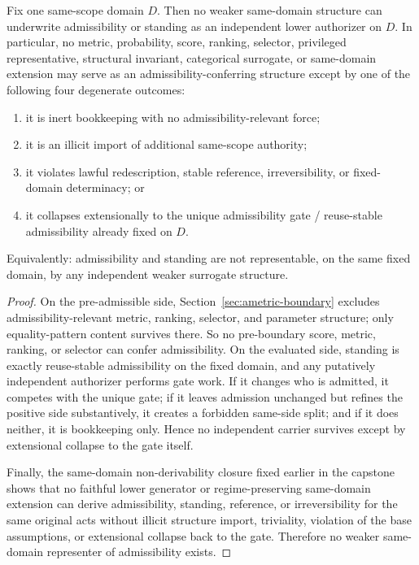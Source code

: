 \begin{theorem}
\label{thm:nonrepresentability-admissibility}
Fix one same-scope domain $D$. Then no weaker same-domain structure can underwrite admissibility or standing as an independent lower authorizer on $D$. In particular, no metric, probability, score, ranking, selector, privileged representative, structural invariant, categorical surrogate, or same-domain extension may serve as an admissibility-conferring structure except by one of the following four degenerate outcomes:
\begin{enumerate}
  \item it is inert bookkeeping with no admissibility-relevant force;
  \item it is an illicit import of additional same-scope authority;
  \item it violates lawful redescription, stable reference, irreversibility, or fixed-domain determinacy; or
  \item it collapses extensionally to the unique admissibility gate / reuse-stable admissibility already fixed on $D$.
\end{enumerate}
Equivalently: admissibility and standing are not representable, on the same fixed domain, by any independent weaker surrogate structure.
\end{theorem}

\begin{proof}
On the pre-admissible side, Section~\ref{sec:ametric-boundary} excludes admissibility-relevant metric, ranking, selector, and parameter structure; only equality-pattern content survives there. So no pre-boundary score, metric, ranking, or selector can confer admissibility. On the evaluated side, standing is exactly reuse-stable admissibility on the fixed domain, and any putatively independent authorizer performs gate work. If it changes who is admitted, it competes with the unique gate; if it leaves admission unchanged but refines the positive side substantively, it creates a forbidden same-side split; and if it does neither, it is bookkeeping only. Hence no independent carrier survives except by extensional collapse to the gate itself.

Finally, the same-domain non-derivability closure fixed earlier in the capstone shows that no faithful lower generator or regime-preserving same-domain extension can derive admissibility, standing, reference, or irreversibility for the same original acts without illicit structure import, triviality, violation of the base assumptions, or extensional collapse back to the gate. Therefore no weaker same-domain representer of admissibility exists.\cite{MaleyAMetric,MaleyNecessity,MaleyUnus,MaleyFoundationalClosure}
\end{proof}

